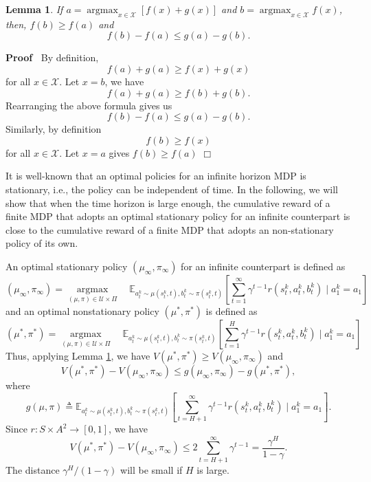 \documentclass{article}
\newcommand{\tmop}[1]{\ensuremath{\operatorname{#1}}}
\newenvironment{proof}{\noindent\textbf{Proof\ }}{\hspace*{\fill}$\Box$\medskip}
\newtheorem{lemma}{Lemma}
\begin{document}
\begin{lemma}
  \label{lem:argmax}If $a = \tmop{argmax}_{x \in \mathcal{X}}  [f (x) + g
  (x)]$ and $b = \tmop{argmax}_{x \in \mathcal{X}} f (x)$, then, $f (b) \geq f
  (a)$ and
  \[ f (b) - f (a) \leq g (a) - g (b) . \]
\end{lemma}

\begin{proof}
  By definition,
  \[ f (a) + g (a) \geq f (x) + g (x) \]
  for all $x \in \mathcal{X}$. Let $x = b$, we have
  \[ f (a) + g (a) \geq f (b) + g (b) . \]
  Rearranging the above formula gives us
  \[ f (b) - f (a) \leq g (a) - g (b) . \]
  Similarly, by definition
  \[ f (b) \geq f (x) \]
  for all $x \in \mathcal{X}$. Let $x = a$ gives $f (b) \geq f (a)$
\end{proof}

It is well-known that an optimal policies for an infinite horizon MDP is
stationary, i.e., the policy can be independent of time. In the following, we
will show that when the time horizon is large enough, the cumulative reward of
a finite MDP that adopts an optimal stationary policy for an infinite
counterpart is close to the cumulative reward of a finite MDP that adopts an
non-stationary policy of its own.

An optimal stationary policy $(\mu_{\infty}, \pi_{\infty})$ for an infinite
counterpart is defined as
\[ (\mu_{\infty}, \pi_{\infty}) = \underset{(\mu, \pi) \in \mathcal{U} \times
   \Pi}{\tmop{argmax}} \quad \mathbb{E}_{a^k_t \sim \mu (s^k_t, t), b^k_t \sim
   \pi (s^k_t, t)} \left[ \sum_{t = 1}^{\infty} \gamma^{t - 1} r (s^k_t,
   a^k_t, b^k_t) \mid a^k_1 = a_1 \right] \]
and an optimal nonstationary policy $(\mu^{\ast}, \pi^{\ast})$ is defined as
\[ (\mu^{\ast}, \pi^{\ast}) = \underset{(\mu, \pi) \in \mathcal{U} \times
   \Pi}{\tmop{argmax}} \quad \mathbb{E}_{a^k_t \sim \mu (s^k_t, t), b^k_t \sim
   \pi (s^k_t, t)} \left[ \sum_{t = 1}^H \gamma^{t - 1} r (s^k_t, a^k_t,
   b^k_t) \mid a^k_1 = a_1 \right] \]
Thus, applying Lemma \ref{lem:argmax}, we have $V (\mu^{\ast}, \pi^{\ast})
\geq V (\mu_{\infty}, \pi_{\infty})$ and
\[ V (\mu^{\ast}, \pi^{\ast}) - V (\mu_{\infty}, \pi_{\infty}) \leq g
   (\mu_{\infty}, \pi_{\infty}) - g (\mu^{\ast}, \pi^{\ast}), \]
where
\[ g (\mu, \pi) \triangleq \mathbb{E}_{a^k_t \sim \mu (s^k_t, t), b^k_t \sim
   \pi (s^k_t, t)} \left[ \sum_{t = H + 1}^{\infty} \gamma^{t - 1} r (s^k_t,
   a^k_t, b^k_t) \mid a^k_1 = a_1 \right] . \]
Since $r : S \times A^2 \rightarrow [0, 1]$, we have
\[ V (\mu^{\ast}, \pi^{\ast}) - V (\mu_{\infty}, \pi_{\infty}) \leq 2 \sum_{t
   = H + 1}^{\infty} \gamma^{t - 1} = \frac{\gamma^H}{1 - \gamma} . \]
The distance $\gamma^H / (1 - \gamma)$ will be small if $H$ is large.

\

\
\end{document}
